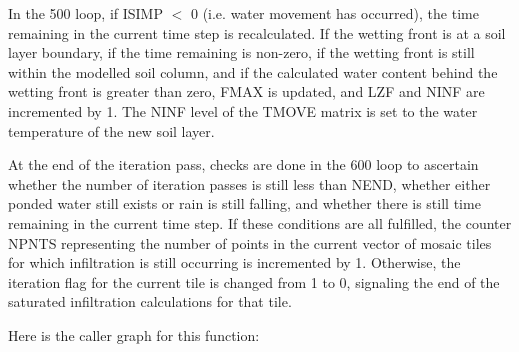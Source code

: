 In the 500 loop, if I\+S\+I\+M\+P $<$ 0 (i.\+e. water movement has occurred), the time remaining in the current time step is recalculated. If the wetting front is at a soil layer boundary, if the time remaining is non-\/zero, if the wetting front is still within the modelled soil column, and if the calculated water content behind the wetting front is greater than zero, F\+M\+A\+X is updated, and L\+Z\+F and N\+I\+N\+F are incremented by 1. The N\+I\+N\+F level of the T\+M\+O\+V\+E matrix is set to the water temperature of the new soil layer.

At the end of the iteration pass, checks are done in the 600 loop to ascertain whether the number of iteration passes is still less than N\+E\+N\+D, whether either ponded water still exists or rain is still falling, and whether there is still time remaining in the current time step. If these conditions are all fulfilled, the counter N\+P\+N\+T\+S representing the number of points in the current vector of mosaic tiles for which infiltration is still occurring is incremented by 1. Otherwise, the iteration flag for the current tile is changed from 1 to 0, signaling the end of the saturated infiltration calculations for that tile.

Here is the caller graph for this function\+:


